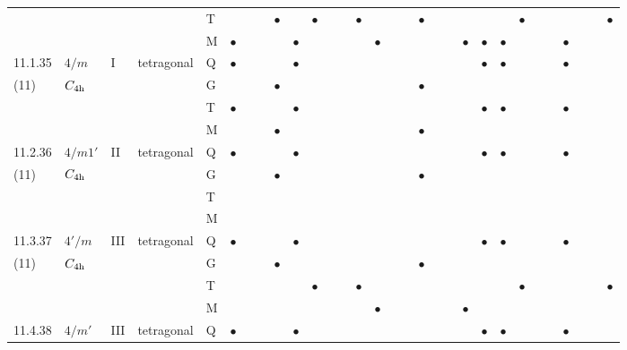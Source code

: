 \documentclass[fleqn,9pt,landscape]{jsarticle}
\begin{document}
\begin{longtable}{lllll|l|lll|ll|lll|l|lll|lll|l|ll|lll|lll}
 &  &  &  & T &  &  &  & $\bullet$ &  & $\bullet$ &  &  & $\bullet$ &  &  &  & $\bullet$ &  &  &  &  &  & $\bullet$ &  &  &  &  &  & $\bullet$ \\
 &  &  &  & M & $\bullet$ &  &  &  & $\bullet$ &  &  &  &  & $\bullet$ &  &  &  &  &  & $\bullet$ & $\bullet$ & $\bullet$ &  &  &  & $\bullet$ &  &  &  \\ \hline
11.1.35 & \texttt{$4/m$} & I & tetragonal & Q & $\bullet$ &  &  &  & $\bullet$ &  &  &  &  &  &  &  &  &  &  &  & $\bullet$ & $\bullet$ &  &  &  & $\bullet$ &  &  &  \\
(11) & $C_{\rm 4h}$ &  &  & G &  &  &  & $\bullet$ &  &  &  &  &  &  &  &  & $\bullet$ &  &  &  &  &  &  &  &  &  &  &  &  \\
 &  &  &  & T & $\bullet$ &  &  &  & $\bullet$ &  &  &  &  &  &  &  &  &  &  &  & $\bullet$ & $\bullet$ &  &  &  & $\bullet$ &  &  &  \\
 &  &  &  & M &  &  &  & $\bullet$ &  &  &  &  &  &  &  &  & $\bullet$ &  &  &  &  &  &  &  &  &  &  &  &  \\ \hline
11.2.36 & \texttt{$4/m1'$} & II & tetragonal & Q & $\bullet$ &  &  &  & $\bullet$ &  &  &  &  &  &  &  &  &  &  &  & $\bullet$ & $\bullet$ &  &  &  & $\bullet$ &  &  &  \\
(11) & $C_{\rm 4h}$ &  &  & G &  &  &  & $\bullet$ &  &  &  &  &  &  &  &  & $\bullet$ &  &  &  &  &  &  &  &  &  &  &  &  \\
 &  &  &  & T &  &  &  &  &  &  &  &  &  &  &  &  &  &  &  &  &  &  &  &  &  &  &  &  &  \\
 &  &  &  & M &  &  &  &  &  &  &  &  &  &  &  &  &  &  &  &  &  &  &  &  &  &  &  &  &  \\ \hline
11.3.37 & \texttt{$4'/m$} & III & tetragonal & Q & $\bullet$ &  &  &  & $\bullet$ &  &  &  &  &  &  &  &  &  &  &  & $\bullet$ & $\bullet$ &  &  &  & $\bullet$ &  &  &  \\
(11) & $C_{\rm 4h}$ &  &  & G &  &  &  & $\bullet$ &  &  &  &  &  &  &  &  & $\bullet$ &  &  &  &  &  &  &  &  &  &  &  &  \\
 &  &  &  & T &  &  &  &  &  & $\bullet$ &  &  & $\bullet$ &  &  &  &  &  &  &  &  &  & $\bullet$ &  &  &  &  &  & $\bullet$ \\
 &  &  &  & M &  &  &  &  &  &  &  &  &  & $\bullet$ &  &  &  &  &  & $\bullet$ &  &  &  &  &  &  &  &  &  \\ \hline
11.4.38 & \texttt{$4/m'$} & III & tetragonal & Q & $\bullet$ &  &  &  & $\bullet$ &  &  &  &  &  &  &  &  &  &  &  & $\bullet$ & $\bullet$ &  &  &  & $\bullet$ &  &  &  \\

\end{longtable}
\end{document}
